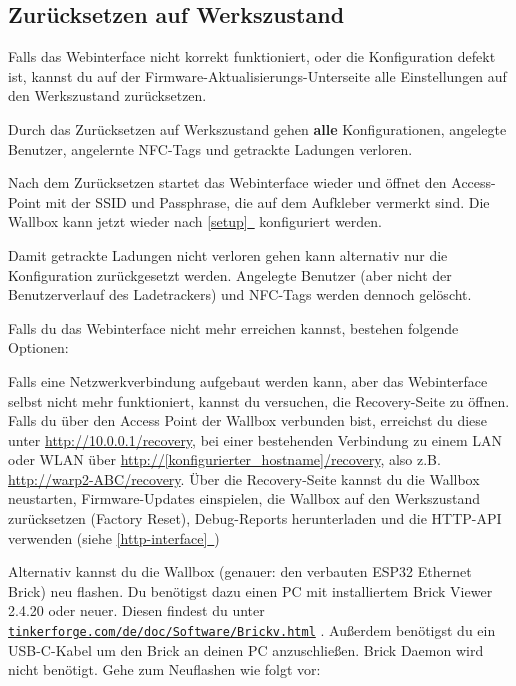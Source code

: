 \documentclass[a4paper,10pt]{article}
\newcommand{\hint}[1]{\begin{tcolorbox}[colback=boxgray,colframe=black,coltext=
white,title=Hinweis,left*=2mm,right*=2mm,boxsep=1mm,bottom=1mm,top=1mm]#1\end{tcolorbox}}
\newcommand*{\fullref}[1]{\hyperref[{#1}]{\ref*{#1}~\nameref*{#1}}}
\newcommand\rurl[2]{%
  \href{#1}{\nolinkurl{#2}}%
}
\begin{document}
\begin{multicols*}{2}
	\subsection{Zurücksetzen auf Werkszustand}\label{reset}
	Falls das Webinterface nicht korrekt funktioniert, oder die Konfiguration defekt ist,
	kannst du auf der Firmware-Aktualisierungs-Unterseite alle Einstellungen auf den Werkszustand zurücksetzen.
	\hint{Durch das Zurücksetzen auf Werkszustand gehen \mbox{\textbf{alle}} Konfigurationen, angelegte Benutzer, angelernte NFC-Tags und getrackte Ladungen verloren.}
	Nach dem Zurücksetzen startet das Webinterface wieder und öffnet
	den Access-Point mit der SSID und Passphrase, die auf dem Aufkleber vermerkt sind. Die Wallbox kann jetzt wieder nach \fullref{setup} konfiguriert werden.

	Damit getrackte Ladungen nicht verloren gehen kann alternativ nur die Konfiguration zurückgesetzt werden.
	Angelegte Benutzer (aber nicht der Benutzerverlauf des Ladetrackers) und NFC-Tags werden dennoch gelöscht.

	Falls du das Webinterface nicht mehr erreichen kannst, bestehen folgende Optionen:

	Falls eine Netzwerkverbindung aufgebaut werden kann, aber das Webinterface selbst nicht mehr funktioniert, kannst du versuchen, die Recovery-Seite zu öffnen.
	Falls du über den Access Point der Wallbox verbunden bist, erreichst du diese unter \url{http://10.0.0.1/recovery},
	bei einer bestehenden Verbindung zu einem LAN oder WLAN über \url{http://[konfigurierter_hostname]/recovery}, also z.B. \url{http://warp2-ABC/recovery}.
	Über die Recovery-Seite kannst du die Wallbox neustarten, Firmware-Updates einspielen,
	die Wallbox auf den Werkszustand zurücksetzen (Factory Reset), Debug-Reports
	herunterladen und die HTTP-API verwenden (siehe \fullref{http-interface})

	Alternativ kannst du die Wallbox (genauer: den verbauten ESP32 Ethernet
	Brick) neu flashen.
	Du benötigst dazu einen PC mit installiertem Brick Viewer 2.4.20 oder neuer. Diesen findest du unter
	\rurl{https://www.tinkerforge.com/de/doc/Software/Brickv.html}{tinkerforge.com/de/doc/Software/Brickv.html}.
	Außerdem benötigst du ein USB-C-Kabel um den Brick an deinen PC anzuschließen. Brick Daemon wird nicht benötigt.
	Gehe zum Neuflashen wie folgt vor:


\end{multicols*}
\end{document}
